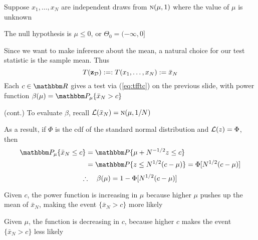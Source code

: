 \begin{frame}

    \vspace{2em}
    \Eg
    Suppose  $x_1,\ldots,x_N$ are independent draws from $\textrm{\sc n}(\mu, 1)$
    where the value of $\mu$ is unknown
    
    The null hypothesis is $\mu
    \leq 0$, or $\Theta_0 = (-\infty, 0]$
    
    Since we want to make inference
    about the mean, a natural choice for our test statistic is the sample
    mean.  Thus 
    \begin{equation*}
        T(\mathbf{z}_{\mathcal D}) :=: T(x_1,\ldots,x_N) := \bar x_N 
    \end{equation*}
    Each $c \in \RR$ gives a test via (\ref{eq:tfftc}) on the previous 
    slide, with power function $\beta(\mu) = \PP_{\mu} \{ \bar{x}_N > c\}$
    
\end{frame}

\begin{frame}

    \vspace{2em}
    \Eg(cont.)
    To evaluate
    $\beta$, recall $\mathcal L(\bar{x}_N) = \textrm{\sc n}(\mu, 1/N)$
    
    As a result, if
    $\Phi$ is the {\sc cdf} of the standard normal distribution and
    $\mathcal L(z) = \Phi$, then
    \begin{align*}
        \PP_{\mu} \{ \bar{x}_N \leq c \} 
        & = \PP\{ \mu + N^{-1/2} z  \leq c \}\\
        & = \PP\{ z \leq N^{1/2}(c - \mu) \} 
        = \Phi[N^{1/2}(c - \mu)]
    \end{align*}
    \begin{equation}
        \label{eq:pfct}
        \therefore \quad
        \beta(\mu) = 1 - \Phi[N^{1/2}(c - \mu)]
    \end{equation}
    
    Given $c$, the power function is increasing in $\mu$ because higher $\mu$
    pushes up the mean of $\bar{x}_N$, making the event $\{ \bar{x}_N > c\}$
    more likely
    
    Given $\mu$, the function is decreasing in $c$, because
    higher $c$ makes the event $\{ \bar{x}_N > c\}$ less likely
    
\end{frame}

